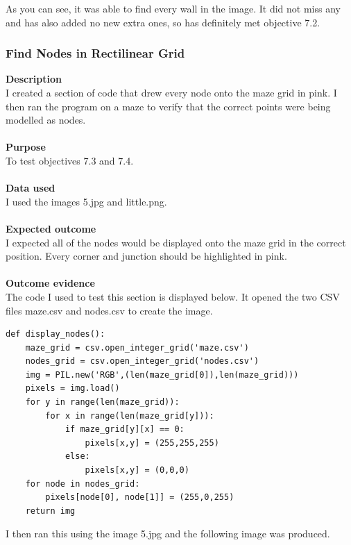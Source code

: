 \documentclass[titlepage]{article}
\begin{document}
As you can see, it was able to find every wall in the image. It did not miss any and has also added no new extra ones, so has definitely met objective 7.2.

\subsubsection{Find Nodes in Rectilinear Grid}
\textbf{Description}\\
I created a section of code that drew every node onto the maze grid in pink. I then ran the program on a maze to verify that the correct points were being modelled as nodes.\\\\
\textbf{Purpose}\\
To test objectives 7.3 and 7.4.\\\\
\textbf{Data used} \\
I used the images 5.jpg and little.png.\\\\
\textbf{Expected outcome}\\
I expected all of the nodes would be displayed onto the maze grid in the correct position. Every corner and junction should be highlighted in pink.\\\\
\textbf{Outcome evidence}\\
The code I used to test this section is displayed below. It opened the two CSV files maze.csv and nodes.csv to create the image. 

\begin{changemargin}{-1in}{-1in} 
\begin{verbatim}
def display_nodes():
    maze_grid = csv.open_integer_grid('maze.csv')
    nodes_grid = csv.open_integer_grid('nodes.csv')
    img = PIL.new('RGB',(len(maze_grid[0]),len(maze_grid)))
    pixels = img.load()
    for y in range(len(maze_grid)):
        for x in range(len(maze_grid[y])):
            if maze_grid[y][x] == 0:
                pixels[x,y] = (255,255,255)
            else:
                pixels[x,y] = (0,0,0)
    for node in nodes_grid:
        pixels[node[0], node[1]] = (255,0,255)
    return img
\end{verbatim}
\end{changemargin} 

I then ran this using the image 5.jpg and the following image was produced.
\end{document}

